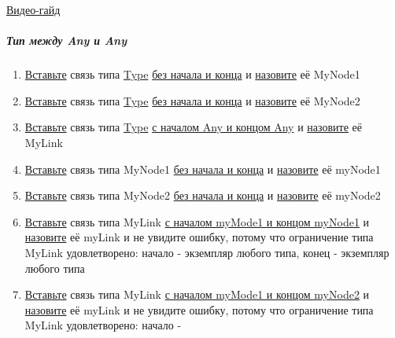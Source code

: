 \href{https://youtu.be/fUpXOe8vlsE}{Видео-гайд}
\subparagraph{Тип между Any и Any}
\begin{enumerate}
      \item \hyperlink{DeepCase.InsertLink.Description}{Вставьте} связь типа
            \hyperlink{Core.Type.Description}{Type}
            \hyperlink{FAQ.HowToInsertLinkWithoutFromAndTo}{без
                  начала и конца} и \hyperlink{FAQ.HowToSetName}{назовите} её
            MyNode1
      \item \hyperlink{DeepCase.InsertLink.Description}{Вставьте} связь типа
            \hyperlink{Core.Type.Description}{Type}
            \hyperlink{FAQ.HowToInsertLinkWithoutFromAndTo}{без
                  начала и конца} и \hyperlink{FAQ.HowToSetName}{назовите} её
            MyNode2
      \item \hyperlink{DeepCase.InsertLink.Description}{Вставьте} связь типа
            \hyperlink{Core.Type.Description}{Type}
            \hyperlink{FAQ.HowToInsertLinkWithFromAndTo}{с
                  началом Any и концом Any} и
            \hyperlink{FAQ.HowToSetName}{назовите} её
            MyLink
      \item \hyperlink{DeepCase.InsertLink.Description}{Вставьте} связь типа
            MyNode1
            \hyperlink{FAQ.HowToInsertLinkWithoutFromAndTo}{без начала и конца}
            и
            \hyperlink{FAQ.HowToSetName}{назовите} её myNode1
      \item \hyperlink{DeepCase.InsertLink.Description}{Вставьте} связь типа
            MyNode2
            \hyperlink{FAQ.HowToInsertLinkWithoutFromAndTo}{без начала и конца}
            и
            \hyperlink{FAQ.HowToSetName}{назовите} её myNode2
      \item \hyperlink{DeepCase.InsertLink.Description}{Вставьте} связь типа
            MyLink
            \hyperlink{FAQ.HowToInsertLinkWithFromAndTo}{с началом myMode1 и
                  концом
                  myNode1} и \hyperlink{FAQ.HowToSetName}{назовите} её myLink и
            не
            увидите
            ошибку, потому что ограничение типа MyLink удовлетворено: начало -
            экземпляр
            любого типа, конец - экземпляр любого типа
      \item \hyperlink{DeepCase.InsertLink.Description}{Вставьте} связь типа
            MyLink
            \hyperlink{FAQ.HowToInsertLinkWithFromAndTo}{с началом myMode1 и
                  концом
                  myNode2} и \hyperlink{FAQ.HowToSetName}{назовите} её myLink и
            не
            увидите
            ошибку, потому что ограничение типа MyLink удовлетворено: начало -

\end{enumerate}
